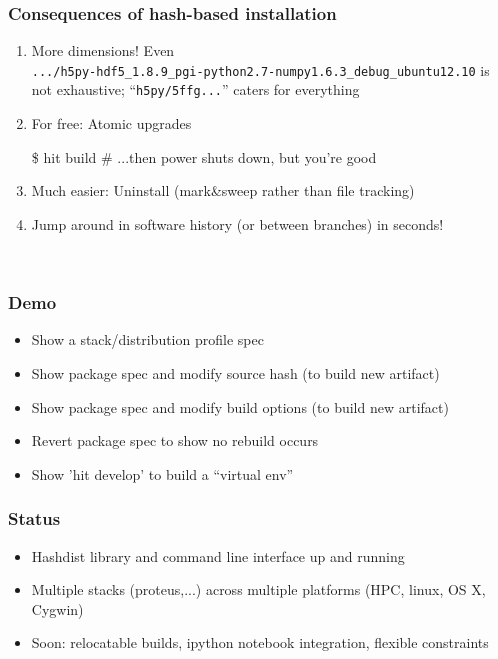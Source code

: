 \documentclass[sans,mathserif]{beamer}
\begin{document}
\begin{frame}[fragile]
  \frametitle{Consequences of hash-based installation}
  \begin{enumerate}
  \item<+-> More dimensions! Even \\
{\footnotesize
{\tt .../h5py-hdf5\_1.8.9\_pgi-python2.7-numpy1.6.3\_debug\_ubuntu12.10}
}
is not exhaustive; ``{\tt h5py/5ffg...}'' caters for everything

  \item<+-> For free: Atomic upgrades
\begin{semiverbatim}
\$ hit build
# ...then power shuts down, but you're good
\end{semiverbatim}

  \item<+-> Much easier: Uninstall (mark\&sweep rather than file tracking)

  \item<+-> Jump around in software history (or between branches) in seconds!


  \end{enumerate}

~

\end{frame}


\begin{frame}
\frametitle{Demo}
\begin{itemize}
\item Show a stack/distribution profile spec
\item Show package spec and modify source hash (to build new artifact)
\item Show package spec and modify build options (to build new artifact)
\item Revert package spec to show no rebuild occurs
\item Show 'hit develop' to build a ``virtual  env''
\end{itemize}
\end{frame}

\begin{frame}
  \frametitle{Status}
  \begin{itemize}
  \item<+-> Hashdist library and command line interface up and running
  \item<+-> Multiple stacks (proteus,...) across multiple platforms (HPC, linux, OS X, Cygwin)
  \item<+-> Soon: relocatable builds, ipython notebook integration, flexible constraints
  \end{itemize}
\end{frame}
\end{document}
